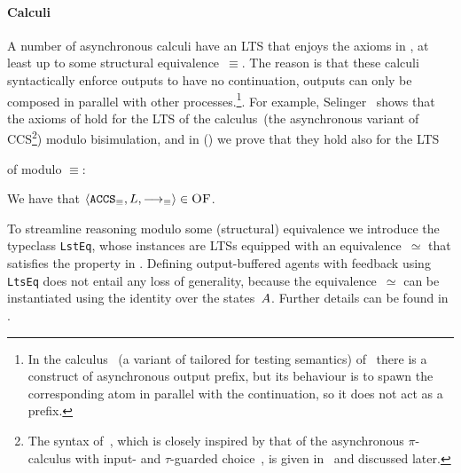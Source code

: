 \paragraph{Calculi}
A number of asynchronous calculi
\cite{DBLP:conf/ecoop/HondaT91,boudol:inria-00076939,DBLP:conf/fsttcs/CastellaniH98,DBLP:journals/toplas/HennessyR02,palamidessi_2003,DBLP:conf/birthday/Sangiorgi19}
have an LTS that enjoys the axioms in , at least up to
some structural equivalence~$\equiv$. The reason is that these calculi
syntactically enforce outputs to have no continuation, \ie outputs can
only be composed in parallel with other
processes.\footnote{In the calculus \TACCS~(a variant of \ACCS
    tailored for testing semantics)
    of~\cite{DBLP:conf/fsttcs/CastellaniH98} there is a construct of
    asynchronous output prefix, but its behaviour is to spawn the
    corresponding atom in parallel with the continuation, so it
      does not act as a prefix.}.  For
example, Selinger~\cite{DBLP:conf/concur/Selinger97} shows that the
  axioms of  hold for the LTS of the calculus~\ACCS (the
asynchronous variant of CCS\footnote{The syntax of~\ACCS, which
    is closely inspired by that of the asynchronous $\pi$-calculus
    with input- and $\tau$-guarded choice~\cite{ACS96,ACS98}, is given
    in~ and discussed later.})  modulo
bisimulation, and in 
()
we prove that they hold also for the LTS {of \ACCS modulo $\equiv$:%
\begin{lemma}
  \label{lem:ACCS-obaFB}
  We have that $\langle {\texttt{ACCS}}_{\equiv}, L, {\mathrel{\overset{}\longrightarrow}}_{\equiv} \rangle \in \textsc{OF}$.
\end{lemma}
}
To streamline
reasoning modulo some (structural) equivalence we introduce the
typeclass \texttt{LstEq}, %
whose instances are LTSs
equipped with an equivalence~$\simeq$
that satisfies the property in .
Defining output-buffered agents with feedback using \texttt{LtsEq}
does not entail any loss of generality, because the equivalence~$\simeq$
can be instantiated using the identity over the states~$A$.
Further details can be found in .




